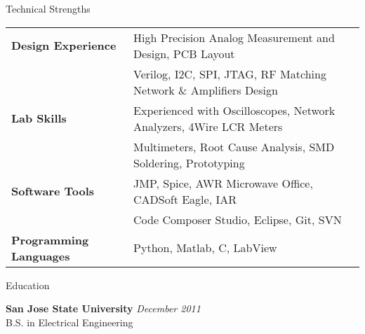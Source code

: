 \documentclass{resume} %
\begin{document}
\begin{rSection}{Technical Strengths}

\begin{tabular}{ @{} >{\bfseries}l @{\hspace{6ex}} l }
Design Experience & High Precision Analog Measurement and Design, PCB Layout \\
& Verilog, I2C, SPI, JTAG, RF Matching Network \& Amplifiers Design\smallskip \\

Lab Skills & Experienced with Oscilloscopes, Network Analyzers, 4Wire LCR Meters\\
& Multimeters, Root Cause Analysis, SMD Soldering, Prototyping \smallskip \\

Software Tools & JMP, Spice, AWR Microwave Office, CADSoft Eagle, IAR\\ 
 & Code Composer Studio, Eclipse, Git, SVN \smallskip \\

Programming Languages & Python, Matlab, C, LabView \smallskip \\ 

\end{tabular}

\end{rSection}
\smallskip

\pagebreak[2]
\begin{rSection}{Education}

{\bf San Jose State University} \hfill {\em December 2011} \\ 
B.S. in Electrical Engineering \\

\end{rSection}





\end{document}
